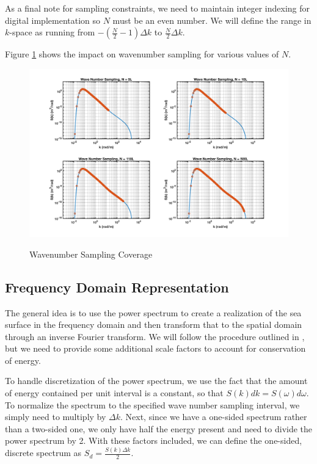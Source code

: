 As a final note for sampling constraints, we need to maintain integer indexing for digital implementation so $N$ must be an even number. We will define the range in $k$-space as running from $-\left(\frac{N}{2}-1\right)\Delta k$ to $\frac{N}{2}\Delta k$.

Figure \ref{os_fig:6aa} shows the impact on wavenumber sampling for various values of $N$.
\begin{figure}[H]
  \begin{center}
\includegraphics[width=6in]{../media/Ocean_Surface/sampling_coverage.png}
  \end{center}
  \renewcommand{\baselinestretch}{1} \small\normalsize
  \begin{quote}
    \caption[Wavenumber Sampling Coverage]{Wavenumber Sampling Coverage\label{os_fig:6aa}}
  \end{quote}
\end{figure}
\renewcommand{\baselinestretch}{2} \small\normalsize

\subsection{Frequency Domain Representation}
The general idea is to use the power spectrum to create a realization of the sea surface in the frequency domain and then transform that to the spatial domain through an inverse Fourier transform. We will follow the procedure outlined in \cite{percival_spectra}, 
but we need to provide some additional scale factors to account for conservation of energy.

To handle discretization of the power spectrum, we use the fact that the amount of energy contained per unit interval is a constant, so that $S(k)dk = S(\omega) d\omega$. To normalize the spectrum to the specified wave number sampling interval, we simply need to multiply by $\Delta k$. Next, since we have a one-sided spectrum rather than a two-sided one, we only have half the energy present and need to divide the power spectrum by 2. With these factors included, we can define the one-sided, discrete spectrum as $S_d = \frac{S(k)\Delta k}{2}$.


